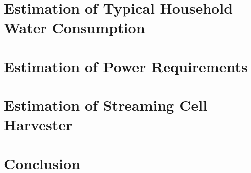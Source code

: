\documentclass[10pt,final,journal]{IEEEtran}
\begin{document}
    \section{Estimation of Typical Household Water Consumption}
    \label{sect:waterConsumption}
    \section{Estimation of Power Requirements}
    \label{sect:powerRequirements}
    \section{Estimation of Streaming Cell Harvester}
    \label{sect:harvesterSize}
    \section{Conclusion}
    
    
\end{document}
